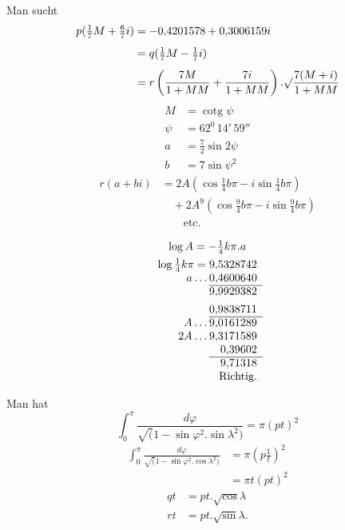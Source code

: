 \noindent Man sucht
{\small
\[\begin{aligned}
p(\tfrac17M+\tfrac67i)&=-0{,}4201578+0{,}3006159i\\[.4em]
&=q(\tfrac17M-\tfrac17i)\\[.4em]
&=r\left(\frac{7M}{1+MM}+\frac{7i}{1+MM}\right).\surd\frac{7(M+i)}{1+MM}
\end{aligned}\]
\[\begin{aligned}M&=\operatorname{cotg}\psi\\\psi&=62^0\,14'\,59''\\a&=\tfrac72\sin2\psi\\b&=7\sin\psi^2\end{aligned}\]
\[\begin{aligned}
r(a+bi)&=2A(\cos\tfrac14b\pi-i\sin\tfrac14b\pi)\\
&\quad+2A^9(\cos\tfrac94b\pi-i\sin\tfrac94b\pi)\\
&\qquad\text{etc.}
\end{aligned}\]}
\noindent\begin{minipage}[t]{.34\linewidth}
{\small\setlength{\arraycolsep}{2pt}
\[\begin{array}{r@{}r}
\multicolumn{2}{c}{\log A=-\frac14k\pi.a}\\[.4em]
\log\frac14k\pi={}&9{,}5328742\\
a\ldots{}&0{,}4600640\\\cline{2-2}
&9{,}9929382\\[.4em]
&0{,}9838711\\\cline{2-2}
A\ldots{}&9{,}0161289\\
2A\ldots{}&9{,}3171589\\
&0{,}39602\\\cline{2-2}
&9{,}71318\\
\multicolumn{2}{r}{\text{Richtig.}}
\end{array}\]}
\end{minipage}\hfill\vrule\hfill\begin{minipage}[t]{.61\linewidth}
\noindent Man hat
{\small
\[\int_0^\pi\frac{d\varphi}{\surd(1-\sin\varphi^2.\sin\lambda^2)}=\pi(pt)^2\]
\[\begin{aligned}
\int_0^\pi\frac{d\varphi}{\surd(1-\sin\varphi^2.\cos\lambda^2)}&=\pi\left(p\frac1t\right)^2\\
&=\pi t(pt)^2
\end{aligned}\]
\[\begin{aligned}qt&=pt.\surd\cos\lambda\\rt&=pt.\surd\sin\lambda.\end{aligned}\]}
\end{minipage}
\clearpage\endgroup
